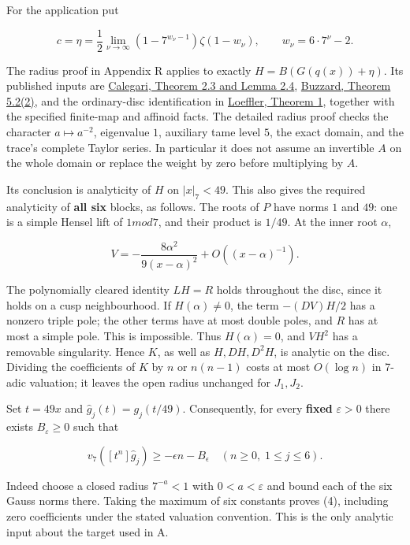 \documentclass[11pt,a4paper]{article}
\begin{document}
For the application put

\[
c=\eta=\frac12\lim_{\nu\to\infty}(1-7^{w_\nu-1})\zeta(1-w_\nu),
\qquad w_\nu=6\cdot7^\nu-2.
\]

The radius proof in Appendix R applies to exactly \(H=B(G(q(x))+η)\). Its published inputs are \href{https://www.math.uchicago.edu/~fcale/papers/Beukers.pdf}{Calegari, Theorem 2.3 and Lemma 2.4}, \href{https://www.ma.imperial.ac.uk/~buzzard/maths/research/papers/wild6.pdf}{Buzzard, Theorem 5.2(2)}, and the ordinary-disc identification in \href{https://arxiv.org/html/math/0701168v3\#S2}{Loeffler, Theorem 1}, together with the specified finite-map and affinoid facts. The detailed radius proof checks the character \(a↦a^{-2}\), eigenvalue \(1\), auxiliary tame level \(5\), the exact domain, and the trace's complete Taylor series. In particular it does not assume an invertible \(A\) on the whole domain or replace the weight by zero before multiplying by \(A\).

Its conclusion is analyticity of \(H\) on \(|x|_{7}<49\). This also gives the required analyticity of \textbf{all six} blocks, as follows. The roots of \(P\) have norms \(1\) and \(49\): one is a simple Hensel lift of \(1 mod 7\), and their product is \(1/49\). At the inner root \(α\),

\[
V=-\frac{8\alpha^2}{9(x-\alpha)^2}+O((x-\alpha)^{-1}).
\]

The polynomially cleared identity \(LH=R\) holds throughout the disc, since it holds on a cusp neighbourhood. If \(H(α)≠0\), the term \(-(DV)H/2\) has a nonzero triple pole; the other terms have at most double poles, and \(R\) has at most a simple pole. This is impossible. Thus \(H(α)=0\), and \(VH^{2}\) has a removable singularity. Hence \(K\), as well as \(H,DH,D^{2}H\), is analytic on the disc. Dividing the coefficients of \(K\) by \(n\) or \(n(n-1)\) costs at most \(O(\operatorname{log} n)\) in 7-adic valuation; it leaves the open radius unchanged for \(J_{1},J_{2}\).

Set \(t=49x\) and \(\widehat{g}_j(t)=g_j(t/49)\). Consequently, for every \textbf{fixed} \(ε>0\) there exists \(B_ε≥0\) such that

\[
v_7([t^n]\widehat g_j)\ge-\epsilon n-B_\epsilon
\quad(n\ge0,\;1\le j\le6).\tag{4}
\]

Indeed choose a closed radius \(7^{-a}<1\) with \(0<a<ε\) and bound each of the six Gauss norms there. Taking the maximum of six constants proves (4), including zero coefficients under the stated valuation convention. This is the only analytic input about the target used in A.
\end{document}
